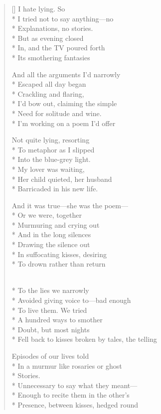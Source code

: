 \begin{verse}[\versewidth]
I hate lying. So\\*
I tried not to say anything---no\\*
Explanations, no stories. \\*
But as evening closed\\*
In, and the TV poured forth\\*
Its smothering fantasies

And all the arguments I'd narrowly\\*
Escaped all day began\\*
Crackling and flaring,\\*
I'd bow out, claiming the simple\\*
Need for solitude and wine.\\*
I'm working on a poem I'd offer

Not quite lying, resorting\\*
To metaphor as I slipped\\*
Into the blue-grey light.\\*
My lover was waiting, \\*
Her child quieted, her husband\\*
Barricaded in his new life.

And it was true---she was the poem---\\*
Or we were, together\\*
Murmuring and crying out\\*
And in the long silences\\*
Drawing the silence out\\*
In suffocating kisses, desiring\\*
To drown rather than return

\\*
To the lies we narrowly\\*
Avoided giving voice to---bad enough\\*
To live them. We tried\\*
A hundred ways to smother\\*
Doubt, but most nights\\*
Fell back to kisses broken by tales, the telling

Episodes of our lives told\\*
In a murmur like rosaries or ghost\\*
Stories. \\*
                 Unnecessary to say what they meant---\\*
Enough to recite them in the other's\\*
Presence, between kisses, hedged round


\end{verse}
